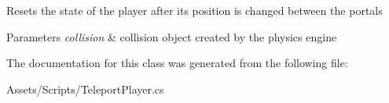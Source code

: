 Resets the state of the player after its position is changed between the portals 
\begin{DoxyParams}{Parameters}
{\em collision} & collision object created by the physics engine \\
\hline
\end{DoxyParams}


The documentation for this class was generated from the following file\+:\begin{DoxyCompactItemize}
\item 
Assets/\+Scripts/Teleport\+Player.\+cs\end{DoxyCompactItemize}
